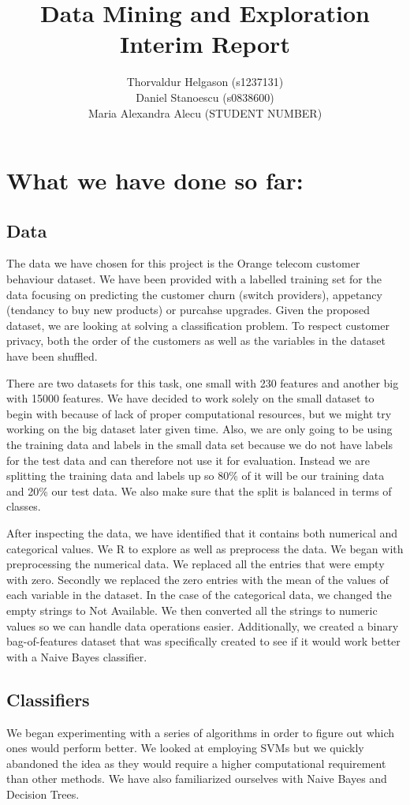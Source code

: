 \documentclass[a4paper,11pt]{article}
\title{Data Mining and Exploration\\Interim Report}
\author{Thorvaldur Helgason (s1237131) \\
Daniel Stanoescu (s0838600) \\
Maria Alexandra Alecu (STUDENT NUMBER)}
\begin{document}
    
\maketitle



\section*{What we have done so far:}
\subsection*{Data}
The data we have chosen for this project is the Orange telecom customer behaviour dataset. We have been provided with a labelled training set for the data focusing on predicting the customer churn (switch providers), appetancy (tendancy to buy new products) or purcahse upgrades. Given the proposed dataset, we are looking at solving a classification problem.  To respect customer privacy, both the order of the customers as well as the variables in the dataset have been shuffled.

There are two datasets for this task, one small with 230 features and another big with 15000 features. We have decided to work solely on the small dataset to begin with because of lack of proper computational resources, but we might try working on the big dataset later given time. Also, we are only going to be using the training data and labels in the small data set because we do not have labels for the test data and can therefore not use it for evaluation. Instead we are splitting the training data and labels up so 80\% of it will be our training data and 20\% our test data. We also make sure that the split is balanced in terms of classes.

After inspecting the data, we have identified that it contains both numerical and categorical values. We R to explore as well as preprocess the data. We began with preprocessing the numerical data. We replaced all the entries that were empty with zero. Secondly we replaced the zero entries with the mean of the values of each variable in the dataset. In the case of the categorical data, we changed the empty strings to Not Available. We then converted all the strings to numeric values so we can handle data operations easier. Additionally, we created a binary bag-of-features dataset that was specifically created to see if it would work better with a Naive Bayes classifier. 


\subsection*{Classifiers}
We began experimenting with a series of algorithms in order to figure out which ones would perform better. We looked at employing SVMs but we quickly abandoned the idea as they would require a higher computational requirement than other methods. We have also familiarized ourselves with Naive Bayes and Decision Trees.
\end{document}
